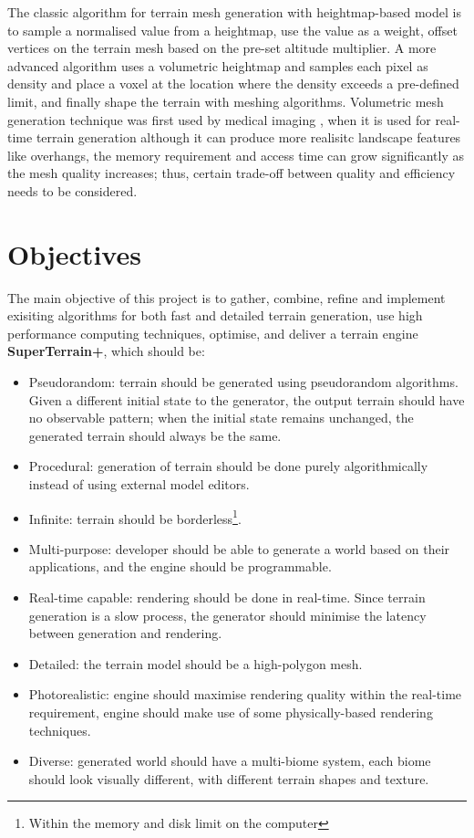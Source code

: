 \documentclass[oneside, a4paper]{article}
\begin{document}
    The classic algorithm for terrain mesh generation with heightmap-based model is to sample a normalised value from a heightmap, use the value as a weight, offset vertices on the terrain mesh based on the pre-set altitude multiplier. A more advanced algorithm \cite{gems3} uses a volumetric heightmap and samples each pixel as density and place a voxel at the location where the density exceeds a pre-defined limit, and finally shape the terrain with meshing algorithms. Volumetric mesh generation technique was first used by medical imaging \cite{marching_cubes}, when it is used for real-time terrain generation although it can produce more realisitc landscape features like overhangs, the memory requirement and access time can grow significantly as the mesh quality increases; thus, certain trade-off between quality and efficiency needs to be considered.

    \section{Objectives}
    The main objective of this project is to gather, combine, refine and implement exisiting algorithms for both fast and detailed terrain generation, use high performance computing techniques, optimise, and deliver a terrain engine \textbf{SuperTerrain+}, which should be:
    \begin{itemize}[label=\(\diamond\)]
        \item Pseudorandom: terrain should be generated using pseudorandom algorithms. Given a different initial state to the generator, the output terrain should have no observable pattern; when the initial state remains unchanged, the generated terrain should always be the same.
        \item Procedural: generation of terrain should be done purely algorithmically instead of using external model editors.
        \item Infinite: terrain should be borderless\footnote{Within the memory and disk limit on the computer}.
        \item Multi-purpose: developer should be able to generate a world based on their applications, and the engine should be programmable.
        \item Real-time capable: rendering should be done in real-time. Since terrain generation is a slow process, the generator should minimise the latency between generation and rendering.
        \item Detailed: the terrain model should be a high-polygon mesh.
        \item Photorealistic: engine should maximise rendering quality within the real-time requirement, engine should make use of some physically-based rendering techniques.
        \item Diverse: generated world should have a multi-biome system, each biome should look visually different, with different terrain shapes and texture.
    \end{itemize}
\end{document}
